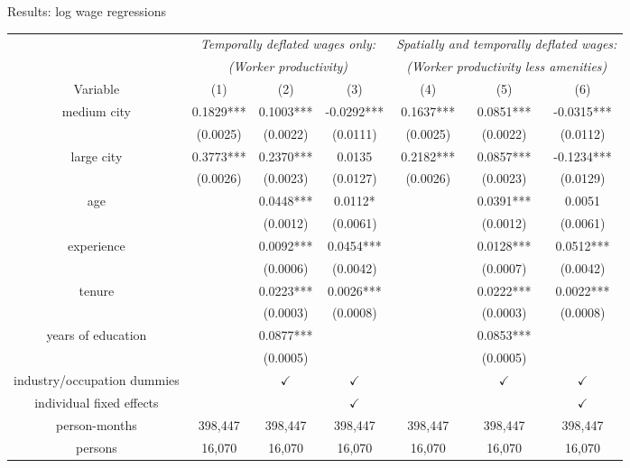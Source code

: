 \documentclass[english,final,t]{beamer}
\begin{document}
\begin{frame}{}
\begin{part}{}
\begin{columns}[t]
		\begin{column}{.44\linewidth}      
      \begin{block}{Results: log wage regressions}
			\begin{small}
			\begin{center}
			\begin{threeparttable}
			\begin{tabular}{cccc|ccc}
			\hline
			& \multicolumn{3}{c|}{\emph{Temporally deflated wages only:}} & \multicolumn{3}{c}{\emph{Spatially and temporally deflated wages:}} \\
			& \multicolumn{3}{c|}{\emph{(Worker productivity)}} & \multicolumn{3}{c}{\emph{(Worker productivity less amenities)}} \\
			Variable & (1) & (2) & (3) & (4) & (5) & (6) \\
			\hline
			medium city & 0.1829*** & 0.1003*** & -0.0292*** & 0.1637*** & 0.0851*** & -0.0315*** \\
			 & (0.0025) & (0.0022) & (0.0111) & (0.0025) & (0.0022) & (0.0112) \\
			large city & 0.3773*** & 0.2370*** & 0.0135 & 0.2182*** & 0.0857*** & -0.1234*** \\
			 & (0.0026) & (0.0023) & (0.0127) & (0.0026) & (0.0023) & (0.0129) \\
			age &  & 0.0448*** & 0.0112* &  & 0.0391*** & 0.0051 \\
			 &  & (0.0012) & (0.0061) &  & (0.0012) & (0.0061) \\
			experience &  & 0.0092*** & 0.0454*** &  & 0.0128*** & 0.0512*** \\
			 &  & (0.0006) & (0.0042) &  & (0.0007) & (0.0042) \\
			tenure &  & 0.0223*** & 0.0026*** &  & 0.0222*** & 0.0022*** \\
			 &  & (0.0003) & (0.0008) &  & (0.0003) & (0.0008) \\
			years of education &  & 0.0877*** &  &  & 0.0853*** &  \\
			 &  & (0.0005) &  &  & (0.0005) &  \\
			\hline
			industry/occupation dummies &  & $\checkmark$ & $\checkmark$ &  & $\checkmark$ & $\checkmark$ \\
			individual fixed effects &  &  & $\checkmark$ &  &  & $\checkmark$ \\
			person-months & 398,447 & 398,447 & 398,447 & 398,447 & 398,447 & 398,447 \\
			persons & 16,070 & 16,070 & 16,070 & 16,070 & 16,070 & 16,070 \\

\end{tabular}
\end{threeparttable}
\end{center}
\end{small}
\end{block}
\end{column}
\end{columns}
\end{part}
\end{frame}
\end{document}
